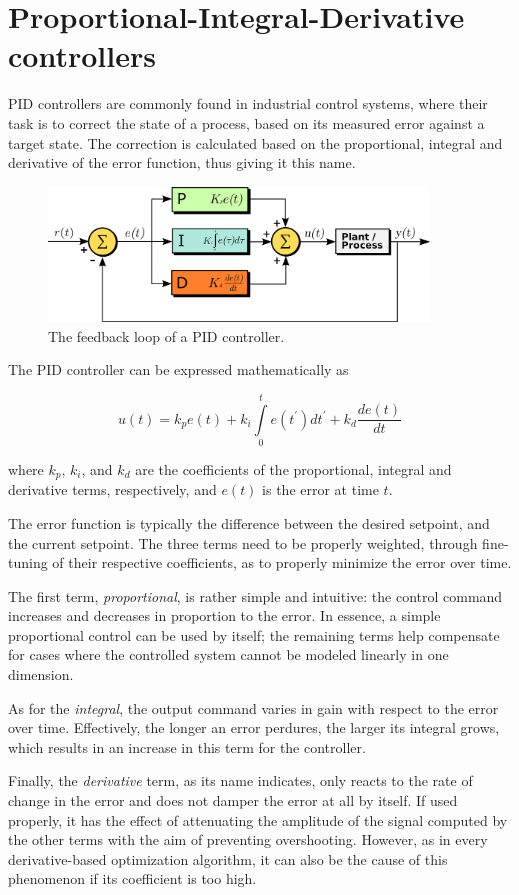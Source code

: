 \section{Proportional-Integral-Derivative controllers}

PID controllers are commonly found in industrial control systems, where their
task is to correct the state of a process, based on its measured error against
a target state. The correction is calculated based on the proportional,
integral and derivative of the error function, thus giving it this name.

\begin{figure}[h]
	\centering
	\includegraphics[width=0.9\textwidth]{figure/pid.png}
	\caption{The feedback loop of a PID controller.}
	\label{fig:pid-loop}
\end{figure}

The PID controller can be expressed mathematically as

\begin{equation}
	u(t) = k_p e(t) + k_i \int\limits_0^t e(t^{\prime}) dt^{\prime} + k_d \frac{de(t)}{dt}
\end{equation}

where $k_p$, $k_i$, and $k_d$ are the coefficients of the proportional,
integral and derivative terms, respectively, and $e(t)$ is the error at time
$t$.

The error function is typically the difference between the desired setpoint,
and the current setpoint. The three terms need to be properly weighted, through
fine-tuning of their respective coefficients, as to properly minimize the error
over time.

The first term, \emph{proportional}, is rather simple and intuitive: the
control command increases and decreases in proportion to the error. In essence,
a simple proportional control can be used by itself; the remaining terms help
compensate for cases where the controlled system cannot be modeled linearly
in one dimension.

As for the \emph{integral}, the output command varies in gain with respect to
the error over time. Effectively, the longer an error perdures, the larger its
integral grows, which results in an increase in this term for the controller.

Finally, the \emph{derivative} term, as its name indicates, only reacts to the
rate of change in the error and does not damper the error at all by itself.
If used properly, it has the effect of attenuating the amplitude of the signal
computed by the other terms with the aim of preventing overshooting. However,
as in every derivative-based optimization algorithm, it can also be the cause
of this phenomenon if its coefficient is too high.\\
